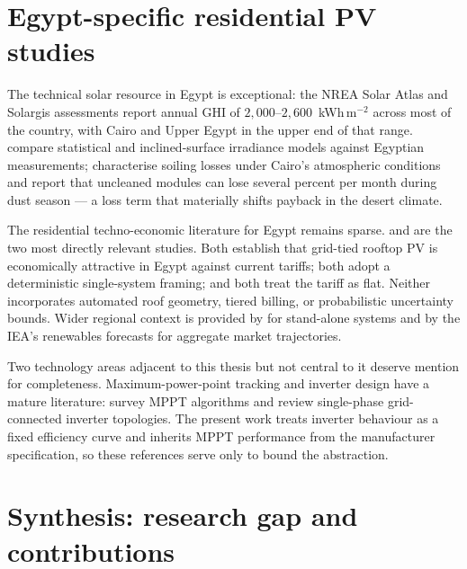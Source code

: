 \section{Egypt-specific residential PV studies}
\label{sec:lit-egypt}

The technical solar resource in Egypt is exceptional: the
NREA Solar Atlas \citep{nrea-atlas} and Solargis assessments
\citep{solargis-egypt} report annual GHI of $2{,}000$--$2{,}600$\,
kWh\,m$^{-2}$ across most of the country, with Cairo and Upper Egypt
in the upper end of that range. \citet{khalil2018} compare statistical
and inclined-surface irradiance models against Egyptian measurements;
\citet{elsayed2017} characterise soiling losses under Cairo's
atmospheric conditions and report that uncleaned modules can lose
several percent per month during dust season --- a loss term that
materially shifts payback in the desert climate.

The residential techno-economic literature for Egypt remains sparse.
\citet{mahmoud2023} and \citet{esmail-negm-2021} are the two most
directly relevant studies. Both establish that grid-tied rooftop PV
is economically attractive in Egypt against current tariffs; both
adopt a deterministic single-system framing; and both treat the
tariff as flat. Neither incorporates automated roof geometry, tiered
billing, or probabilistic uncertainty bounds. Wider regional context
is provided by \citet{mohamed2020} for stand-alone systems and by
the IEA's renewables forecasts \citep{iea-renewables-2023} for
aggregate market trajectories.

Two technology areas adjacent to this thesis but not central to it
deserve mention for completeness. Maximum-power-point tracking and
inverter design have a mature literature: \citet{esram2007} survey
MPPT algorithms and \citet{kjaer2005} review single-phase
grid-connected inverter topologies. The present work treats inverter
behaviour as a fixed efficiency curve and inherits MPPT performance
from the manufacturer specification, so these references serve only
to bound the abstraction.

\section{Synthesis: research gap and contributions}
\label{sec:lit-gap}

